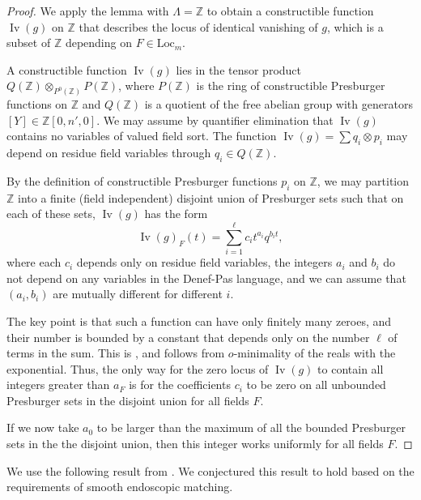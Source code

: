 \documentclass[12pt]{amsart}
\newcommand{\op}[1]{\operatorname{#1}}
\newcommand{\ring}[1]{{\mathbb #1}}
\newcommand{\locus}[1]{\op{Iv}(#1)}
\newcommand{\Loc}{\mathrm{Loc}}
\theoremstyle{plain}
\theoremstyle{definition}
\begin{document}
\begin{proof}
We apply the lemma with $\Lambda=\ring{Z}$ to obtain a constructible
function $\locus{g}$ on $\ring{Z}$ that describes the locus of identical
vanishing of $g$, which is a subset of $\ring{Z}$ depending on $F\in\Loc_m$.

A constructible function $\locus{g}$ lies in the tensor product
$Q(\ring{Z})\otimes_{P^0(\ring{Z})} P(\ring{Z})$, where $P(\ring{Z})$
is the ring of constructible Presburger functions on $\ring{Z}$ and
$Q(\ring{Z})$ is a quotient of the free abelian group with generators
$[Y]\in \ring{Z}[0,n',0]$.  We may assume by quantifier elimination
that $\locus{g}$ contains no variables of valued field sort.  The
function $\locus{g} = \sum q_i\otimes p_i$ may depend on residue field
variables through $q_i\in Q(\ring{Z})$.

By the definition of constructible Presburger functions $p_i$ on
$\ring{Z}$, we may partition $\ring{Z}$ into a finite (field
independent) disjoint union of Presburger sets such that on each of
these sets, $\locus{g}$ has the form
\[
\locus{g}_F(t) = \sum_{i=1}^\ell c_i t^{a_i} q^{b_i t},
\]
where each $c_i$ depends only on residue field variables, the integers
$a_i$ and $b_i$ do not depend on any variables in the Denef-Pas
language, and we can assume that $(a_i,b_i)$ are mutually different
for different $i$.

The key point is that such a function can have only finitely many
zeroes, and their number is bounded by a constant that depends only on
the number $\ell$ of terms in the sum.  This is \cite[Lemma 2.1.7]{CGH1},
and follows from $o$-minimality of the reals with the exponential.
Thus, the only way for the zero locus of $\locus{g}$ to contain all integers
greater than $a_F$ is for the coefficients $c_i$ to be zero on all
unbounded Presburger sets in the disjoint union for all fields $F$.

If we now take $a_0$ to be larger than the maximum of all the bounded
Presburger sets in the the disjoint union, then this integer works
uniformly for all fields $F$.
\end{proof}



We use the following result from \cite{CGH2}.  We conjectured
this result to hold based on the 
requirements of smooth endoscopic matching.
\end{document}
